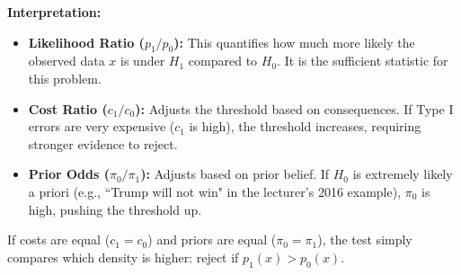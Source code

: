 \textbf{Interpretation:}
\begin{itemize}
    \item \textbf{Likelihood Ratio ($p_1/p_0$):} This quantifies how much more likely the observed data $x$ is under $H_1$ compared to $H_0$. It is the sufficient statistic for this problem.
    \item \textbf{Cost Ratio ($c_1/c_0$):} Adjusts the threshold based on consequences. If Type I errors are very expensive ($c_1$ is high), the threshold increases, requiring stronger evidence to reject.
    \item \textbf{Prior Odds ($\pi_0/\pi_1$):} Adjusts based on prior belief. If $H_0$ is extremely likely a priori (e.g., ``Trump will not win" in the lecturer's 2016 example), $\pi_0$ is high, pushing the threshold up.
\end{itemize}

\begin{remark}
If costs are equal ($c_1=c_0$) and priors are equal ($\pi_0=\pi_1$), the test simply compares which density is higher: reject if $p_1(x) > p_0(x)$.
\end{remark}

